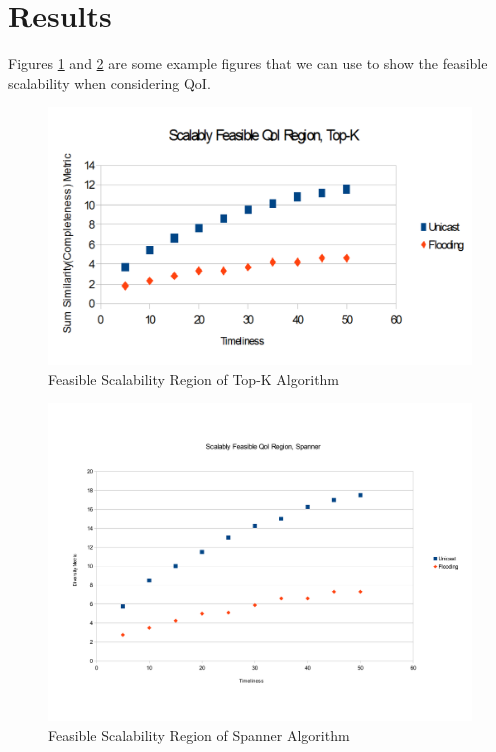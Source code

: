 \section{Results}
\label{sec:results}

Figures \ref{fig:topkScalR} and \ref{fig:spanScalR} are some example figures that we can use to show the feasible scalability when considering QoI.

\begin{figure} 
    \includegraphics[scale=0.35]{figures/topkScalR.pdf}
    \caption{Feasible Scalability Region of Top-K Algorithm}
    \label{fig:topkScalR}
\end{figure}

\begin{figure} 
    \includegraphics[scale=0.35]{figures/spanScalR.pdf}
    \caption{Feasible Scalability Region of Spanner Algorithm}
    \label{fig:spanScalR}
\end{figure}


